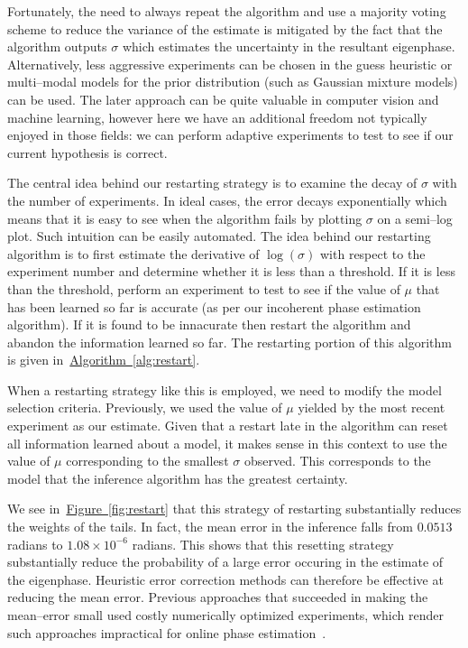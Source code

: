 \documentclass[aps,pra,amsmath,twocolumn,amssymb,superscriptaddress]{revtex4-1}
\newcommand{\fig}[1]{\hyperref[fig:#1]{Figure~\ref*{fig:#1}}}
\newcommand{\alg}[1]{\hyperref[alg:#1]{Algorithm~\ref*{alg:#1}}}
\begin{document}
Fortunately, the need to always repeat the algorithm and use a majority voting scheme to reduce the variance of the estimate is mitigated by the fact that the algorithm outputs $\sigma$ which estimates the uncertainty in the resultant eigenphase. 
Alternatively, less aggressive experiments can be chosen in the guess heuristic or multi--modal models for the prior distribution (such as Gaussian mixture models) can be used.  The later approach can be quite valuable in computer vision and machine learning, however here we have an additional freedom not typically enjoyed in those fields: we can perform adaptive experiments to test to see if our current hypothesis is correct.

The central idea behind our restarting strategy is to examine the decay of $\sigma$ with the number of experiments.  In ideal cases, the error decays exponentially which means that it is easy to see when the algorithm fails by plotting $\sigma$ on a semi--log plot.  Such intuition can be easily automated.  The idea behind our restarting algorithm is to first estimate the derivative of $\log(\sigma)$ with respect to the experiment number and determine whether it is less than a threshold.  If it is less than the threshold, perform an experiment to test to see if the value of $\mu$ that has been learned so far is accurate (as per our incoherent phase estimation algorithm).  If it is found to be innacurate then restart the algorithm and abandon the information learned so far.  The restarting portion of this algorithm is given in~\alg{restart}.

When a restarting strategy like this is employed, we need to modify the model selection criteria.  Previously, we used the value of $\mu$ yielded by the most recent experiment as our estimate.   Given that a restart late in the algorithm can reset all information learned about a model, it makes sense in this context to use the value of $\mu$ corresponding to the smallest $\sigma$ observed.  This corresponds to the model that the inference algorithm has the greatest certainty.

We see in~\fig{restart} that this strategy of restarting substantially reduces the weights of the tails.  In fact, the mean error in the inference falls from $0.0513$ radians to $1.08\times 10^{-6}$ radians.  This shows that this resetting strategy substantially reduce the probability of a large error occuring in the estimate of the eigenphase.  Heuristic error correction methods can therefore be effective at reducing the mean error.  Previous approaches that succeeded in making the mean--error small used costly numerically optimized experiments, which render such approaches impractical for online phase estimation~\cite{granade_robust_2012,ferrie_how_2013, wiebe_hamiltonian_2014,wiebe_quantum_2014-1,WGC15}.
\end{document}
